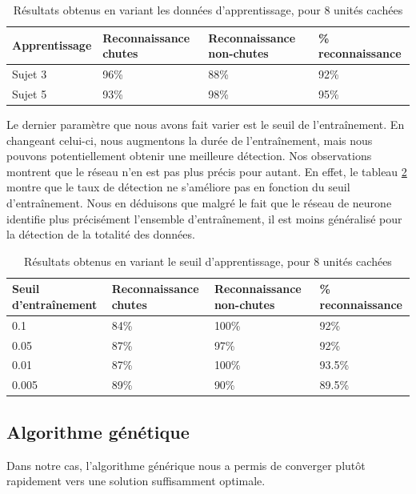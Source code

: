 \documentclass[12pt,letterpaper]{article}
\begin{document}
\begin{table}
\centering
\begin{tabular}{|p{1.2in}|p{1.3in}|p{1.3in}|p{1.5in}|}
    \hline
    \bf{Apprentissage} & \bf{Reconnaissance chutes} & \bf{Reconnaissance non-chutes} & \% \bf{reconnaissance} \\ \hline
    Sujet 3 & 96\% & 88\% & 92\%  \\ \hline
    Sujet 5 & 93\%  & 98\% & 95\% \\ \hline
\end{tabular}
\caption{Résultats obtenus en variant les données d'apprentissage, pour 8 unités cachées}
\label{tbl:neural_results2}
\end{table}

Le dernier paramètre que nous avons fait varier est le seuil de l'entraînement. En changeant celui-ci, nous augmentons la durée de l'entraînement, mais nous pouvons potentiellement obtenir une meilleure détection. Nos observations montrent que le réseau n'en est pas plus précis pour autant. En effet, le tableau \ref{tbl:neural_results3} montre que le taux de détection ne s'améliore pas en fonction du seuil d'entraînement. Nous en déduisons que malgré le fait que le réseau de neurone identifie plus précisément l'ensemble d'entraînement, il est moins généralisé pour la détection de la totalité des données. 

\begin{table}
\centering
\begin{tabular}{|p{1.2in}|p{1.3in}|p{1.3in}|p{1.5in}|}
    \hline
    \bf{Seuil d'entraînement} & \bf{Reconnaissance chutes} & \bf{Reconnaissance non-chutes} & \% \bf{reconnaissance} \\ \hline
    0.1 & 84\% & 100\% & 92\%  \\ \hline
    0.05 & 87\%  & 97\% & 92\% \\ \hline
    0.01 & 87\%  & 100\% & 93.5\% \\ \hline
    0.005 & 89\%  & 90\% & 89.5\% \\ \hline
\end{tabular}
\caption{Résultats obtenus en variant le seuil d'apprentissage, pour 8 unités cachées}
\label{tbl:neural_results3}
\end{table}

\subsection{Algorithme génétique}

Dans notre cas, l'algorithme générique nous a permis de converger plutôt rapidement vers une solution suffisamment optimale.
\end{document}
